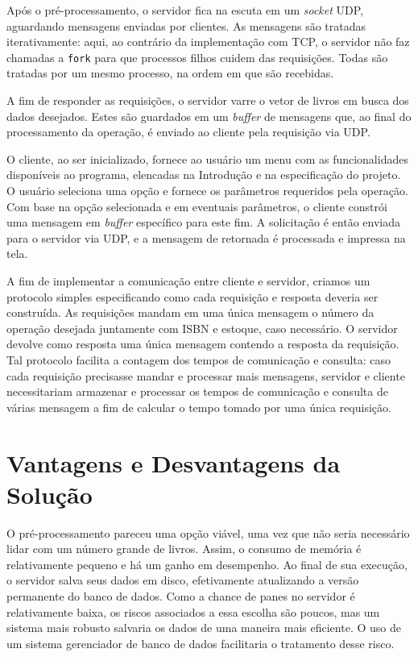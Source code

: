\documentclass[11pt, brazil]{article} %
\begin{document}
Após o pré-processamento, o servidor fica na escuta em um \emph{socket} UDP, aguardando mensagens enviadas por clientes. As mensagens são tratadas iterativamente: aqui, ao contrário
da implementação com TCP, o servidor não faz chamadas a \texttt{fork} para que processos filhos cuidem das requisições. Todas são tratadas por um mesmo
processo, na ordem em que são recebidas.

A fim de responder as requisições, o servidor varre o vetor de livros em busca dos dados
desejados. Estes são guardados em um \emph{buffer} de mensagens que, ao
final do processamento da operação, é enviado ao cliente pela requisição via UDP.

O cliente, ao ser inicializado, fornece ao usuário um menu com as funcionalidades disponíveis
ao programa, elencadas na Introdução e na especificação do projeto. 
O usuário seleciona uma opção e fornece os parâmetros requeridos pela operação.
Com base na opção selecionada e em eventuais parâmetros, o cliente constrói uma mensagem em
\emph{buffer} específico para este fim. 
A solicitação é então enviada para o servidor via UDP, e a mensagem de retornada é processada
e impressa na tela.

A fim de implementar a comunicação entre cliente e servidor, criamos um protocolo simples
especificando como cada requisição e resposta deveria ser
construída. As requisições mandam em uma única mensagem o número da operação desejada
juntamente com ISBN e estoque, caso necessário. O servidor devolve
como resposta uma única mensagem contendo a resposta da requisição. Tal protocolo
facilita a contagem dos tempos de comunicação e consulta: caso cada requisição precisasse
mandar e processar mais mensagens, servidor e cliente necessitariam armazenar e processar os
tempos de comunicação e consulta de várias mensagem a fim de calcular o tempo tomado por
uma única requisição.

\section{Vantagens e Desvantagens da Solução}

O pré-processamento pareceu uma opção viável, uma vez que não seria necessário lidar com um
número grande de livros. Assim, o consumo de memória é relativamente pequeno e há um ganho em desempenho. 
Ao final de sua execução, o servidor salva seus dados em disco, efetivamente atualizando a versão permanente do banco de dados.
Como a chance de panes no servidor é relativamente baixa, os riscos associados a essa escolha são poucos, mas um sistema mais robusto salvaria os dados de uma maneira mais eficiente. 
O uso de um sistema gerenciador de banco de dados facilitaria o tratamento desse risco.
\end{document}
